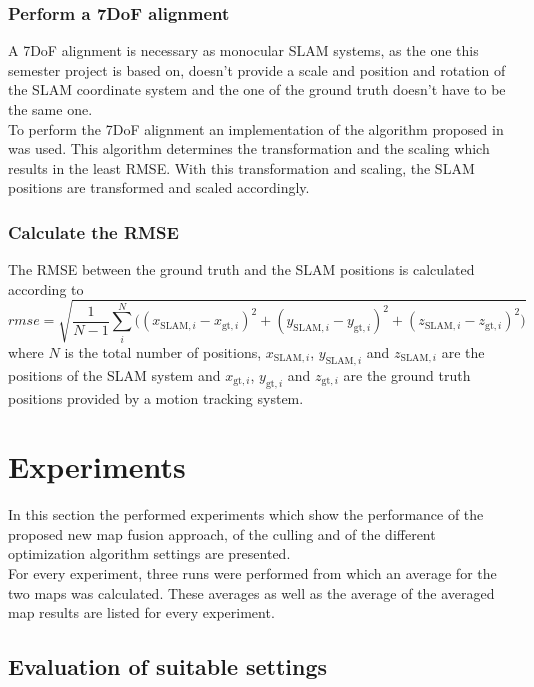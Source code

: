 \subsubsection{Perform a 7DoF alignment}
A 7DoF alignment is necessary as monocular \ac{SLAM} systems, as the one this semester project is based on, doesn't provide a scale and position and rotation of the \ac{SLAM} coordinate system and the one of the ground truth doesn't have to be the same one.\\

To perform the 7DoF alignment an implementation of the algorithm proposed in \cite{Umeyama1991} was used. This algorithm determines the transformation and the scaling which results in the least \ac{RMSE}. With this transformation and scaling, the \ac{SLAM} positions are transformed and scaled accordingly.

\subsubsection{Calculate the \acf{RMSE}}
The \acf{RMSE} between the ground truth and the \ac{SLAM} positions is calculated according to
\begin{equation}
  \textit{rmse} = \sqrt{\frac{1}{N - 1} \sum_i^N \big( (x_{\text{SLAM},i} - x_{\text{gt},i})^2 + (y_{\text{SLAM},i} - y_{\text{gt},i})^2 + (z_{\text{SLAM},i} - z_{\text{gt},i})^2\big)}
\end{equation}
where $N$ is the total number of positions, $x_{\text{SLAM},i}$, $y_{\text{SLAM},i}$ and $z_{\text{SLAM},i}$ are the positions of the \ac{SLAM} system and $x_{\text{gt},i}$, $y_{\text{gt},i}$ and $z_{\text{gt},i}$ are the ground truth positions provided by a motion tracking system.

\section{Experiments}
\label{sec:experiments}

In this section the performed experiments which show the performance of the proposed new map fusion approach, of the culling and of the different optimization algorithm settings are presented.\\

For every experiment, three runs were performed from which an average for the two maps was calculated. These averages as well as the average of the averaged map results are listed for every experiment.

\subsection{Evaluation of suitable settings}
\label{subsec:suitable_settings}
